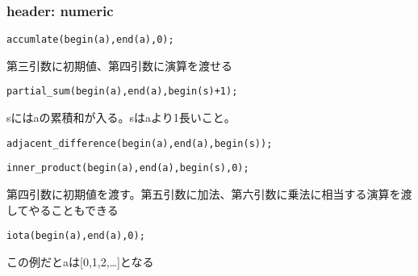 \subsubsection{header: numeric}
\begin{lstlisting}[caption=和]
accumlate(begin(a),end(a),0);
\end{lstlisting}
第三引数に初期値、第四引数に演算を渡せる
\begin{lstlisting}[caption=累積和]
partial_sum(begin(a),end(a),begin(s)+1);
\end{lstlisting}
sにはaの累積和が入る。sはaより1長いこと。
\begin{lstlisting}[caption=階差数列]
adjacent_difference(begin(a),end(a),begin(s));
\end{lstlisting}
\begin{lstlisting}[caption=内積]
inner_product(begin(a),end(a),begin(s),0);
\end{lstlisting}
第四引数に初期値を渡す。第五引数に加法、第六引数に乗法に相当する演算を渡してやることもできる
\begin{lstlisting}[caption=連続した数列]
iota(begin(a),end(a),0);
\end{lstlisting}
この例だとaは[0,1,2,\ldots]となる
